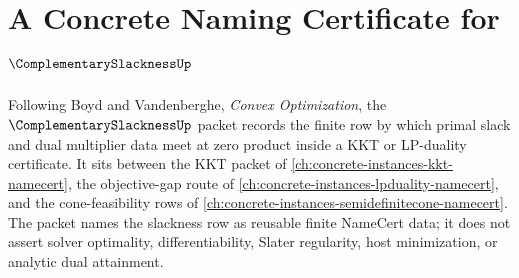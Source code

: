 \chapter{A Concrete Naming Certificate for $\ComplementarySlacknessUp$}
\label{ch:concrete-instances-complementary-slackness-namecert}

Following Boyd and Vandenberghe, \emph{Convex Optimization}, the $\ComplementarySlacknessUp$ packet records the finite row by which primal slack and dual multiplier data meet at zero product inside a KKT or LP-duality certificate. It sits between the KKT packet of \autoref{ch:concrete-instances-kkt-namecert}, the objective-gap route of \autoref{ch:concrete-instances-lpduality-namecert}, and the cone-feasibility rows of \autoref{ch:concrete-instances-semidefinitecone-namecert}. The packet names the slackness row as reusable finite NameCert data; it does not assert solver optimality, differentiability, Slater regularity, host minimization, or analytic dual attainment.

